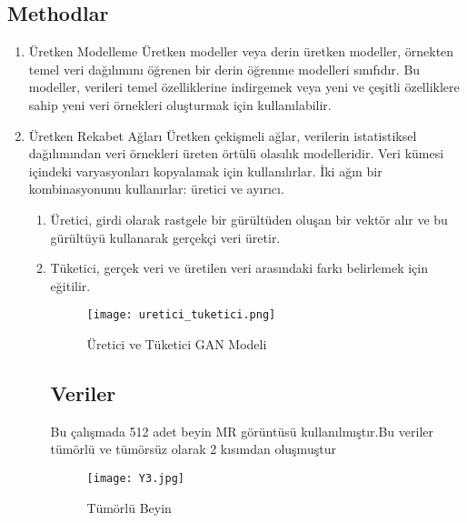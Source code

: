 \documentclass[12pt,a4paper]{article}
\begin{document}
	\begin{center}
	
		\section*{Methodlar}
		\begin{enumerate}
			\item  Üretken Modelleme
			Üretken modeller veya derin üretken modeller, örnekten temel veri dağılımını öğrenen bir derin öğrenme modelleri sınıfıdır. Bu modeller, verileri temel özelliklerine indirgemek veya yeni ve çeşitli özelliklere sahip yeni veri örnekleri oluşturmak için kullanılabilir.
			\item Üretken Rekabet Ağları
			Üretken çekişmeli ağlar, verilerin istatistiksel dağılımından veri örnekleri üreten örtülü olasılık modelleridir. Veri kümesi içindeki varyasyonları kopyalamak için kullanılırlar. İki ağın bir kombinasyonunu kullanırlar: üretici ve ayırıcı.
		
			\begin{enumerate}
				\section*{üretici ve tüketici Neler İçerir}
				\item Üretici, girdi olarak rastgele bir gürültüden oluşan bir vektör alır ve bu gürültüyü kullanarak gerçekçi veri üretir.
				\item  Tüketici, gerçek veri ve üretilen veri arasındaki farkı belirlemek için eğitilir.
				
				\begin{figure}[htbp]
					\centering
					\texttt{[image: uretici\_tuketici.png]}
					\caption{Üretici ve Tüketici GAN Modeli}
					\label{fig:uretici_tuketici}
				\end{figure}
				
							
				\begin{center}
					\section*{Veriler}
				\end{center}
				
				
				Bu çalışmada 512 adet beyin MR görüntüsü kullanılmıştır.Bu veriler tümörlü ve tümörsüz olarak 2 kısımdan oluşmuştur
				
				\begin{figure}[htbp]
					\centering
					\texttt{[image: Y3.jpg]}
					\caption{Tümörlü Beyin}
					\label{fig:uretici_tuketici}
				\end{figure}
				

\end{enumerate}
\end{enumerate}
\end{center}
\end{document}
